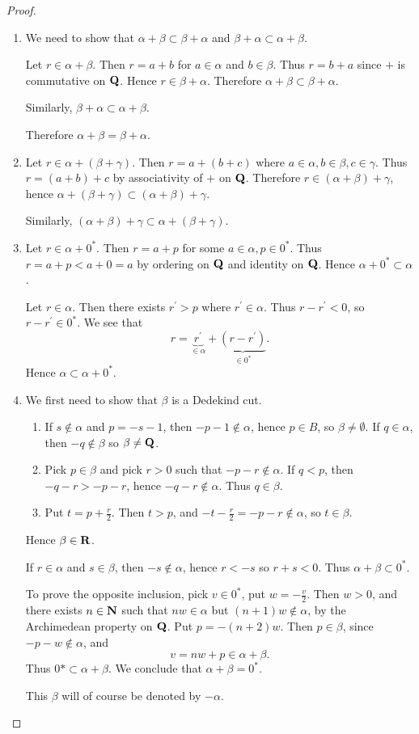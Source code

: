 \begin{proof} \
\begin{enumerate}[label=(\roman*)]
\item We need to show that $\alpha+\beta\subset\beta+\alpha$ and $\beta+\alpha\subset\alpha+\beta$.

Let $r\in\alpha+\beta$. Then $r=a+b$ for $a\in\alpha$ and $b\in\beta$. Thus $r=b+a$ since $+$ is commutative on $\mathbf Q$. Hence $r\in\beta+\alpha$. Therefore $\alpha+\beta\subset\beta+\alpha$.

Similarly, $\beta+\alpha\subset\alpha+\beta$.

Therefore $\alpha+\beta=\beta+\alpha$.

\item Let $r\in\alpha+(\beta+\gamma)$. Then $r=a+(b+c)$ where $a\in\alpha,b\in\beta,c\in\gamma$. Thus $r=(a+b)+c$ by associativity of $+$ on $\mathbf Q$. Therefore $r\in(\alpha+\beta)+\gamma$, hence $\alpha+(\beta+\gamma)\subset(\alpha+\beta)+\gamma$.

Similarly, $(\alpha+\beta)+\gamma\subset\alpha+(\beta+\gamma)$.

\item Let $r\in\alpha+0^*$. Then $r=a+p$ for some $a\in\alpha,p\in0^*$. Thus $r=a+p<a+0=a$ by ordering on $\mathbf Q$ and identity on $\mathbf Q$. Hence $\alpha+0^*\subset\alpha$.

Let $r\in\alpha$. Then there exists $r^\prime>p$ where $r^\prime\in\alpha$. Thus $r-r^\prime<0$, so $r-r^\prime\in0^*$. We see that
\[ r=\underbrace{r^\prime}_{\in\alpha}+\underbrace{(r-r^\prime)}_{\in0^*}. \]
Hence $\alpha\subset\alpha+0^*$.

\item We first need to show that $\beta$ is a Dedekind cut.
\begin{enumerate}[label=(\roman*)]
\item If $s\notin\alpha$ and $p=-s-1$, then $-p-1\notin\alpha$, hence $p\in B$, so $\beta\neq\emptyset$. If $q\in\alpha$, then $-q\notin\beta$ so $\beta\neq\mathbf Q$.
\item Pick $p\in\beta$ and pick $r>0$ such that $-p-r\notin\alpha$. If $q<p$, then $-q-r>-p-r$, hence $-q-r\notin\alpha$. Thus $q\in\beta$.
\item Put $t=p+\frac{r}{2}$. Then $t>p$, and $-t-\frac{r}{2}=-p-r\notin\alpha$, so $t\in\beta$.
\end{enumerate}
Hence $\beta\in\mathbf R$.

If $r\in\alpha$ and $s\in\beta$, then $-s\notin\alpha$, hence $r<-s$ so $r+s<0$. Thus $\alpha+\beta\subset0^*$.

To prove the opposite inclusion, pick $v\in0^*$, put $w=-\frac{v}{2}$. Then $w>0$, and there exists $n\in\mathbf N$ such that $nw\in\alpha$ but $(n+1)w\notin\alpha$, by the Archimedean property on $\mathbf Q$. Put $p=-(n+2)w$. Then $p\in\beta$, since $-p-w\notin\alpha$, and
\[v=nw+p\in\alpha+\beta.\]
Thus $0*\subset\alpha+\beta$. We conclude that $\alpha+\beta=0^*$.

This $\beta$ will of course be denoted by $-\alpha$.
\end{enumerate}
\end{proof}

